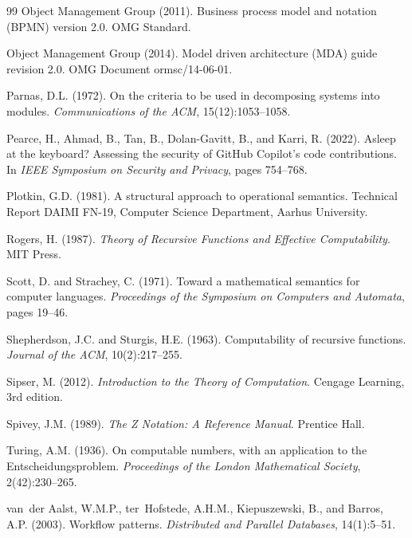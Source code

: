 \documentclass[11pt,a4paper]{article}
\begin{document}
\begin{thebibliography}{99}
Object Management Group (2011).
\newblock Business process model and notation (BPMN) version 2.0.
\newblock OMG Standard.

Object Management Group (2014).
\newblock Model driven architecture (MDA) guide revision 2.0.
\newblock OMG Document ormsc/14-06-01.

Parnas, D.L. (1972).
\newblock On the criteria to be used in decomposing systems into modules.
\newblock \emph{Communications of the ACM}, 15(12):1053--1058.

Pearce, H., Ahmad, B., Tan, B., Dolan-Gavitt, B., and Karri, R. (2022).
\newblock Asleep at the keyboard? Assessing the security of GitHub Copilot's code contributions.
\newblock In \emph{IEEE Symposium on Security and Privacy}, pages 754--768.

Plotkin, G.D. (1981).
\newblock A structural approach to operational semantics.
\newblock Technical Report DAIMI FN-19, Computer Science Department, Aarhus University.

Rogers, H. (1987).
\newblock \emph{Theory of Recursive Functions and Effective Computability}.
\newblock MIT Press.

Scott, D. and Strachey, C. (1971).
\newblock Toward a mathematical semantics for computer languages.
\newblock \emph{Proceedings of the Symposium on Computers and Automata}, pages 19--46.

Shepherdson, J.C. and Sturgis, H.E. (1963).
\newblock Computability of recursive functions.
\newblock \emph{Journal of the ACM}, 10(2):217--255.

Sipser, M. (2012).
\newblock \emph{Introduction to the Theory of Computation}.
\newblock Cengage Learning, 3rd edition.

Spivey, J.M. (1989).
\newblock \emph{The Z Notation: A Reference Manual}.
\newblock Prentice Hall.

Turing, A.M. (1936).
\newblock On computable numbers, with an application to the Entscheidungsproblem.
\newblock \emph{Proceedings of the London Mathematical Society}, 2(42):230--265.

van~der Aalst, W.M.P., ter~Hofstede, A.H.M., Kiepuszewski, B., and Barros, A.P. (2003).
\newblock Workflow patterns.
\newblock \emph{Distributed and Parallel Databases}, 14(1):5--51.

\end{thebibliography}
\end{document}
